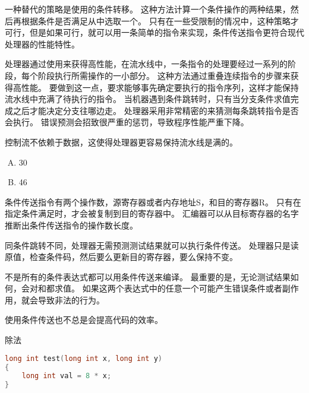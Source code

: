 {{        一种替代的策略是使用的条件转移。
        这种方法计算一个条件操作的两种结果，然后再根据条件是否满足从中选取一个。
        只有在一些受限制的情况中，这种策略才可行，但是如果可行，就可以用一条简单的指令来实现，条件传送指令更符合现代处理器的性能特性。

        处理器通过使用来获得高性能，在流水线中，一条指令的处理要经过一系列的阶段，每个阶段执行所需操作的一小部分。
        这种方法通过重叠连续指令的步骤来获得高性能。
        要做到这一点，要求能够事先确定要执行的指令序列，这样才能保持流水线中充满了待执行的指令。
        当机器遇到条件跳转时，只有当分支条件求值完成之后才能决定分支往哪边走。
        处理器采用非常精密的来猜测每条跳转指令是否会执行。
        错误预测会招致很严重的惩罚，导致程序性能严重下降。

        控制流不依赖于数据，这使得处理器更容易保持流水线是满的。

        \begin{practicec}
            \begin{enumerate}[A.]
                \item 30
                \item 46
            \end{enumerate}
        \end{practicec}

        条件传送指令有两个操作数，源寄存器或者内存地址S，和目的寄存器R。
        只有在指定条件满足时，才会被复制到目的寄存器中。
        汇编器可以从目标寄存器的名字推断出条件传送指令的操作数长度。

        同条件跳转不同，处理器无需预测测试结果就可以执行条件传送。
        处理器只是读原值，检查条件码，然后要么更新目的寄存器，要么保持不变。

        不是所有的条件表达式都可以用条件传送来编译。
        最重要的是，无论测试结果如何，会对和都求值。
        如果这两个表达式中的任意一个可能产生错误条件或者副作用，就会导致非法的行为。

        使用条件传送也不总是会提高代码的效率。

        \begin{practicec}
            除法
        \end{practicec}

        \begin{practicec}
            \begin{lstlisting}[language=C]
long int test(long int x, long int y)
{
    long int val = 8 * x;
}
            \end{lstlisting}
        \end{practicec}
    }
}
